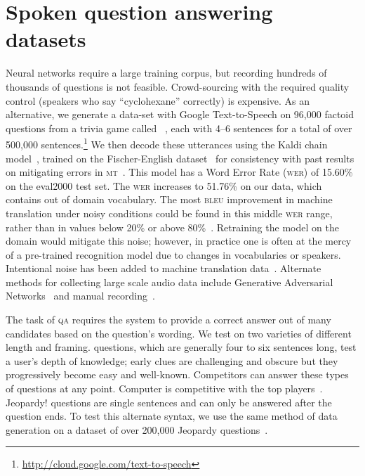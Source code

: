 	
\section{Spoken question answering datasets}
\label{sec:data}





Neural networks require a large training corpus, but recording
hundreds of thousands of questions is not feasible. Crowd-sourcing
with the required quality control (speakers who say
``cyclohexane'' correctly) is expensive.
As an alternative, we generate a data-set with Google Text-to-Speech on 96,000 factoid questions from a trivia game called \qb{}~\cite{Boyd-Graber:Feng:Rodriguez-2018}, each with 4--6 sentences for a total of over 500,000 sentences.\footnote{\url{http://cloud.google.com/text-to-speech}}
We then decode these utterances using the Kaldi chain model~\cite{peddinti2015jhu}, trained on the Fischer-English dataset~\cite{cieri2004fisher} for consistency with past results on mitigating \asr{} errors in \textsc{mt}~\cite{sperber17emnlp}.  This model has a Word Error Rate (\textsc{wer}) of 15.60\% on the eval2000 test set.  The \textsc{wer} increases to 51.76\% on our \qb{} data, which contains out of domain vocabulary.   The most \textsc{bleu} improvement in machine translation under noisy conditions could be found in this middle  \textsc{wer} range, rather than in values below 20\% or above 80\%~\cite{sperber17emnlp}.  Retraining the model on the \qb{} domain would mitigate this noise;
however, in practice one is often at the mercy of a pre-trained
recognition model due to changes in vocabularies or speakers.
Intentional noise has been added to machine translation
data~\cite{michel2018mtnt, belinkov2017synthetic}.
Alternate methods for collecting large scale audio data include
Generative Adversarial Networks~\cite{donahue2018exploring} and manual
recording~\cite{lee2018odsqa}.

   
The task of \textsc{qa} requires the system to provide a correct answer out of many candidates based on the question's wording. We test on two varieties of different length and framing.  \qb{} questions, which are generally four to six sentences long, test a user's depth of knowledge; early clues are challenging and obscure but they progressively become easy and well-known.  Competitors can answer these types of questions at any point.
Computer  is competitive with the top players~\cite{yamada2018studio}.  Jeopardy! questions are single sentences and can only be answered after the question ends.  To test this alternate syntax, we use the same method of data generation on a dataset of over 200,000 Jeopardy questions~\cite{Dunn2017SearchQAAN}.










